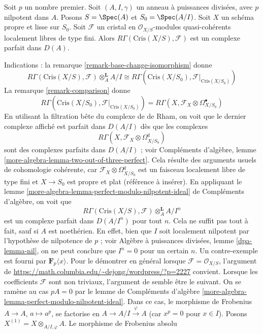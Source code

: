 \begin{remark}
\label{remark-perfect}
Soit $p$ un nombre premier. Soit $(A, I, \gamma)$ un anneau à puissances
divisées, avec $p$ nilpotent dans $A$. Posons $S = \Spec(A)$ et
$S_0 = \Spec(A/I)$. Soit $X$ un schéma propre et lisse sur $S_0$.
Soit $\mathcal{F}$ un cristal en
$\mathcal{O}_{X/S}$-modules quasi-cohérents localement libres de type fini.
Alors $R\Gamma(\text{Cris}(X/S), \mathcal{F})$ est un
complexe parfait dans $D(A)$.

\medskip\noindent
Indications : la remarque \ref{remark-base-change-isomorphism} donne
$$
R\Gamma(\text{Cris}(X/S), \mathcal{F}) \otimes_A^\mathbf{L} A/I
\cong
R\Gamma(\text{Cris}(X/S_0), \mathcal{F}|_{\text{Cris}(X/S_0)})
$$
La remarque \ref{remark-comparison} donne
$$
R\Gamma(\text{Cris}(X/S_0), \mathcal{F}|_{\text{Cris}(X/S_0)}) =
R\Gamma(X, \mathcal{F}_X \otimes \Omega^\bullet_{X/S_0})
$$
En utilisant la filtration bête du complexe de de Rham, on voit que
le dernier complexe affiché est parfait dans $D(A/I)$ dès que les complexes
$$
R\Gamma(X, \mathcal{F}_X \otimes \Omega^q_{X/S_0})
$$
sont des complexes parfaits dans $D(A/I)$ ; voir
Compléments d'algèbre, lemme \ref{more-algebra-lemma-two-out-of-three-perfect}.
Cela résulte des arguments usuels
de cohomologie cohérente, car $\mathcal{F}_X \otimes \Omega^q_{X/S_0}$
est un faisceau localement libre de type fini et $X \to S_0$ est propre et plat
(référence à insérer). En appliquant le
lemme \ref{more-algebra-lemma-perfect-modulo-nilpotent-ideal} de Compléments d'algèbre,
on voit que
$$
R\Gamma(\text{Cris}(X/S), \mathcal{F}) \otimes_A^\mathbf{L} A/I^n
$$
est un complexe parfait dans $D(A/I^n)$ pour tout $n$. Cela ne suffit pas tout à fait,
sauf si $A$ est noethérien. En effet, bien que $I$ soit localement nilpotent
par l'hypothèse de nilpotence de $p$ ; voir
Algèbre à puissances divisées, lemme \ref{dpa-lemma-nil},
on ne peut conclure que $I^n = 0$ pour un certain $n$. Un contre-exemple
est fourni par $\mathbf{F}_p\langle x \rangle$. Pour le démontrer en général lorsque
$\mathcal{F} = \mathcal{O}_{X/S}$, l'argument de
\url{https://math.columbia.edu/~dejong/wordpress/?p=2227}
convient. Lorsque les coefficients $\mathcal{F}$ sont non triviaux,
l'argument de \cite{Faltings-very} semble être le suivant. On se ramène au
cas $pA = 0$ par le lemme de Compléments d'algèbre
\ref{more-algebra-lemma-perfect-modulo-nilpotent-ideal}.
Dans ce cas, le morphisme de Frobenius $A \to A$, $a \mapsto a^p$, se factorise
en $A \to A/I \xrightarrow{\varphi} A$ (car $x^p = 0$ pour $x \in I$). Posons
$X^{(1)} = X \otimes_{A/I, \varphi} A$. Le morphisme de Frobenius absolu

\end{remark}
